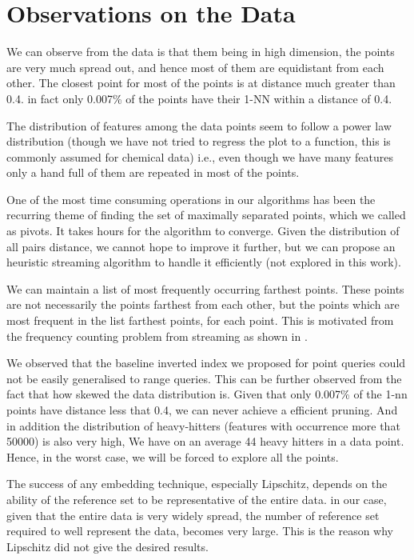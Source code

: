 \section{Observations on the Data}

We can observe from the data is that them being in high dimension, the points are very much spread out, and hence most of them are equidistant from each other.
The closest point for most of the points is at distance much greater than 0.4. in fact only 0.007\% of the points have their 1-NN within a distance of 0.4.

The distribution of features among the data points seem to follow a power law distribution (though we have not tried to regress the plot to a function, this is commonly assumed for chemical data)  i.e., even though we have many features only a hand full of them are repeated in most of the points.

One of the most time consuming operations in our algorithms has been the recurring theme of finding the set of maximally separated points, which we called as pivots. It takes hours for the algorithm to converge. Given the distribution of all pairs distance, we cannot hope to improve it further, but we can propose an heuristic streaming algorithm to handle it efficiently (not explored in this work).

We can maintain a list of most frequently occurring farthest points. These points are not necessarily the points farthest from each other, but the points which are most frequent in the list farthest points, for each point. This is motivated from the frequency counting problem from streaming as shown in \citet*{metwally2005efficient}.

We observed that the baseline inverted index we proposed for point queries could not be easily generalised  to range queries. This can be further observed from the fact that how skewed the data distribution is. Given that only 0.007\% of the 1-nn points have distance less that 0.4, we can never achieve a efficient pruning. And in addition the distribution of heavy-hitters (features with occurrence more that 50000) is also very high, We have on an average 44 heavy hitters in a data point. Hence, in the worst case, we will be forced to explore all the points.

The success of any embedding technique, especially Lipschitz, depends on the ability of the reference set to be representative of the entire data. in our case, given that the entire data is very widely spread, the number of reference set required to well represent the data, becomes very large. This is the reason why Lipschitz did not give the desired results.

